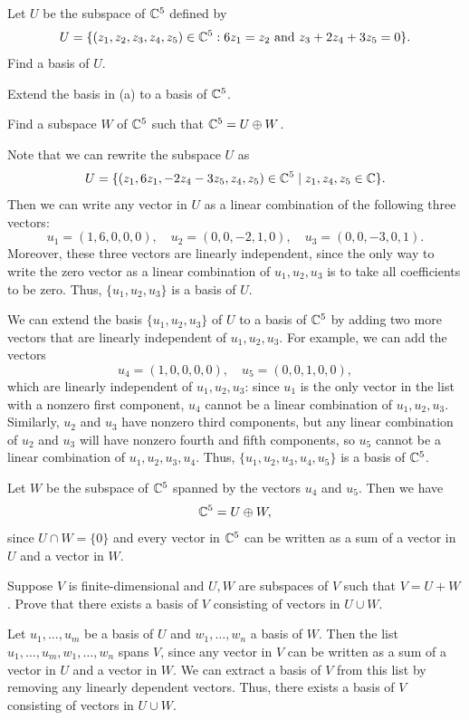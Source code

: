 \begin{exc}
\begin{exercise}\leavevmode
\begin{parts}
\item Let $U$ be the subspace of $\mathbb{C}^5$ defined by
  \[ U = \{(z_1,z_2,z_3,z_4,z_5)\in\mathbb{C}^5 : 6z_1=z_2 \text{ and }
     z_3+2z_4+3z_5=0\}. \]
  Find a basis of $U$.
\item Extend the basis in (a) to a basis of $\mathbb{C}^5$.
\item Find a subspace $W$ of $\mathbb{C}^5$ such that $\mathbb{C}^5=U\oplus W$.
\end{parts}
\end{exercise}
\begin{solution}\leavevmode
\begin{parts}
\item Note that we can rewrite the subspace $U$ as
  \[ U = \{(z_1,6z_1,-2z_4-3z_5,z_4,z_5)\in\mathbb{C}^5 \mid z_1,z_4,z_5\in\mathbb{C}\}. \]
  Then we can write any vector in $U$ as a linear combination of the following
  three vectors:
  \[ u_1=(1,6,0,0,0), \quad u_2=(0,0,-2,1,0), \quad u_3=(0,0,-3,0,1). \]
  Moreover, these three vectors are linearly independent, since the only way to
  write the zero vector as a linear combination of $u_1,u_2,u_3$ is to take all
  coefficients to be zero. Thus, $\{u_1,u_2,u_3\}$ is a basis of $U$.
\item We can extend the basis $\{u_1,u_2,u_3\}$ of $U$ to a basis of $\mathbb{C}^5$ by
  adding two more vectors that are linearly independent of $u_1,u_2,u_3$. For
  example, we can add the vectors
  \[ u_4=(1,0,0,0,0), \quad u_5=(0,0,1,0,0), \]
  which are linearly independent of $u_1,u_2,u_3$: since $u_1$ is the only
  vector in the list with a nonzero first component, $u_4$ cannot be a linear
  combination of $u_1,u_2,u_3$. Similarly, $u_2$ and $u_3$ have nonzero third
  components, but any linear combination of $u_2$ and $u_3$ will have nonzero
  fourth and fifth components, so $u_5$ cannot be a linear combination of
  $u_1,u_2,u_3,u_4$. Thus, $\{u_1,u_2,u_3,u_4,u_5\}$ is a basis of $\mathbb{C}^5$.
\item Let $W$ be the subspace of $\mathbb{C}^5$ spanned by the vectors $u_4$ and $u_5$.
  Then we have
  \[ \mathbb{C}^5 = U\oplus W, \]
  since $U\cap W=\{0\}$ and every vector in $\mathbb{C}^5$ can be written as a sum of a
  vector in $U$ and a vector in $W$.
\end{parts}
\end{solution}

\begin{exercise}
Suppose $V$ is finite-dimensional and $U,W$ are subspaces of $V$ such that
$V=U+W$. Prove that there exists a basis of $V$ consisting of vectors in
$U\cup W$.
\end{exercise}
\begin{solution}
Let $u_1,\dots,u_m$ be a basis of $U$ and $w_1,\dots,w_n$ a basis of $W$. Then
the list $u_1,\dots,u_m,w_1,\dots,w_n$ spans $V$, since any vector in $V$ can be
written as a sum of a vector in $U$ and a vector in $W$. We can extract a basis
of $V$ from this list by removing any linearly dependent vectors. Thus, there
exists a basis of $V$ consisting of vectors in $U\cup W$.
\end{solution}


\end{exc}
